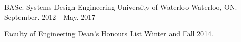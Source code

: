 

\begin{cventries}

  \cventry
    {BASc. Systems Design Engineering} %
    {University of Waterloo} %
    {Waterloo, ON.} %
    {September. 2012 - May. 2017} %
    {
      \begin{cvitems} %
      	\item{Faculty of Engineering Dean’s Honours List Winter and Fall 2014.}
      \end{cvitems}
    }

\end{cventries}
